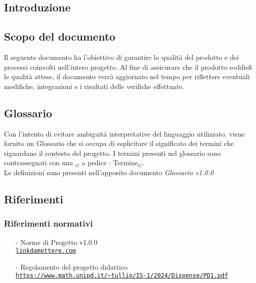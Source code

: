 \documentclass[10pt]{article}
\begin{document}
\newpage
\tableofcontents
\newpage
\listoffigures %
\newpage
\listoftables %
\newpage
\begin{justify}

\section{Introduzione}

\subsection{Scopo del documento}
Il seguente documento ha l'obiettivo di garantire la qualità del prodotto e dei processi coinvolti nell'intero progetto. Al fine di assicurare che il prodotto soddisfi le qualità attese, il documento
verrà aggiornato nel tempo per riflettere eventuali modifiche, integrazioni e i risultati delle verifiche effettuate.


\subsection{Glossario}
Con l'intento di evitare ambiguità interpretative del linguaggio utilizzato, viene fornito un Glossario che si occupa di esplicitare il significato dei termini che riguardano il contesto del progetto. I termini presenti nel glossario sono contrassegnati con una $_G$ a pedice : Termine$_G$.\\
Le definizioni sono presenti nell'apposito documento \textit{Glossario v1.0.0}


\subsection{Riferimenti}


\subsubsection{Riferimenti normativi}
\begin{itemize}
    \item[-] Norme di Progetto v1.0.0\\
    \textcolor{blue}{\texttt{\url{linkdamettere.com}}}

    \item[-] Regolamento del progetto didattico  \\
    \textcolor{blue}{\texttt{\url{https://www.math.unipd.it/~tullio/IS-1/2024/Dispense/PD1.pdf}}}


\end{itemize}
\end{justify}
\end{document}
